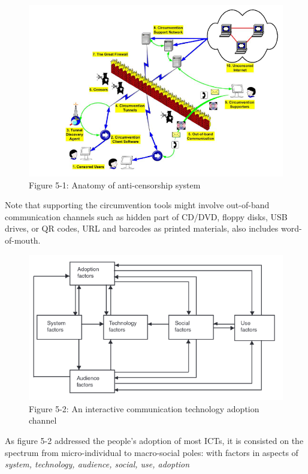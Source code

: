 \begin{figure}
\centering
\includegraphics{./res/5.1-anatomy.png}
\caption{Figure 5-1: Anatomy of anti-censorship system}
\end{figure}

Note that supporting the circumvention tools might involve out-of-band
communication channels such as hidden part of CD/DVD, floppy disks, USB
drives, or QR codes, URL and barcodes as printed materials, also
includes word-of-mouth.

\begin{figure}
\centering
\includegraphics{./res/5.2-adoption.png}
\caption{Figure 5-2: An interactive communication technology adoption
channel}
\end{figure}

As figure 5-2 \cite{49_ICTAdopt} addressed the people's adoption of most
ICTs, it is consisted on the spectrum from micro-individual to
macro-social poles: with factors in aspects of \emph{system, technology,
audience, social, use, adoption}


